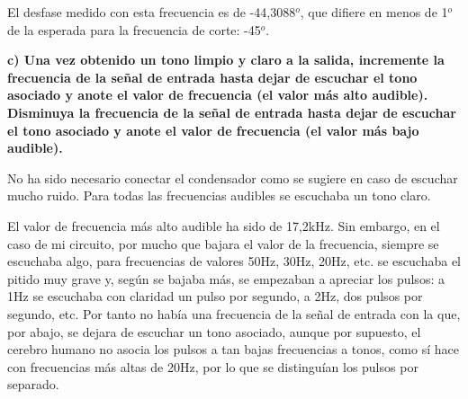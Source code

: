 \documentclass{article}
\begin{document}
El desfase medido con esta frecuencia es de -44,3088$^o$, que difiere en menos de 1$^o$ de la esperada para la frecuencia de corte: -45$^o$.
\bigskip

\textbf{c) Una vez obtenido un tono limpio y claro a la salida, incremente la frecuencia de la
señal de entrada hasta dejar de escuchar el tono asociado y anote el valor de frecuencia
(el valor más alto audible). Disminuya la frecuencia de la señal de entrada hasta dejar
de escuchar el tono asociado y anote el valor de frecuencia (el valor más bajo audible).}

No ha sido necesario conectar el condensador como se sugiere en caso de escuchar mucho ruido. Para todas las frecuencias audibles se escuchaba un tono claro.

El valor de frecuencia más alto audible ha sido de 17,2kHz. Sin embargo, en el caso de mi circuito, por mucho que bajara el valor de la frecuencia, siempre se escuchaba algo, para frecuencias de valores 50Hz, 30Hz, 20Hz, etc. se escuchaba el pitido muy grave y, según se bajaba más, se empezaban a apreciar los pulsos: a 1Hz se escuchaba con claridad un pulso por segundo, a 2Hz, dos pulsos por segundo, etc. Por tanto no había una frecuencia de la señal de entrada con la que, por abajo, se dejara de escuchar un tono asociado, aunque por supuesto, el cerebro humano no asocia los pulsos a tan bajas frecuencias a tonos, como sí hace con frecuencias más altas de 20Hz, por lo que se distinguían los pulsos por separado.
\end{document}
